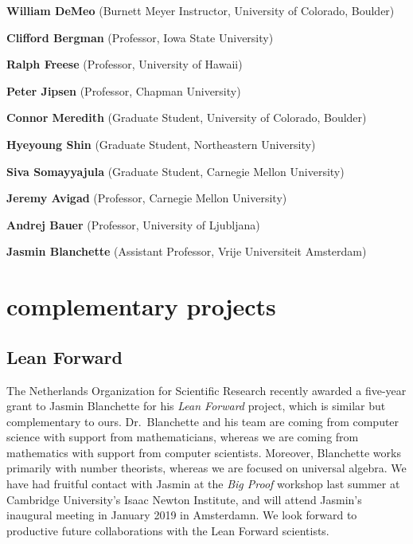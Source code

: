 \documentclass[11pt]{amsart}  %
\begin{document}
\vskip2mm
\hskip4.7mm {\bf William DeMeo} (Burnett Meyer Instructor, University of Colorado, Boulder)

\vskip5mm


\vskip2mm
\hskip4.7mm {\bf Clifford Bergman} (Professor, Iowa State University)

\vskip2mm
\hskip4.7mm {\bf Ralph Freese} (Professor, University of Hawaii)

\vskip2mm
\hskip4.7mm {\bf Peter Jipsen} (Professor, Chapman University)

\vskip2mm
\hskip4.7mm {\bf Connor Meredith} (Graduate Student, University of Colorado, Boulder)

\vskip2mm
\hskip4.7mm {\bf Hyeyoung Shin} (Graduate Student, Northeastern University)

\vskip2mm
\hskip4.7mm {\bf Siva Somayyajula} (Graduate Student, Carnegie Mellon University)



\vskip5mm


\vskip2mm
\hskip4.7mm {\bf Jeremy Avigad} (Professor, Carnegie Mellon University)

\vskip2mm
\hskip4.7mm {\bf Andrej Bauer} (Professor, University of Ljubljana)

\vskip2mm
\hskip4.7mm {\bf Jasmin Blanchette} (Assistant Professor, Vrije Universiteit Amsterdam)


  


\newpage







\section{complementary projects}

\subsection{Lean Forward}
The Netherlands Organization for Scientific Research recently awarded a five-year grant to Jasmin Blanchette for his \emph{Lean Forward} project, which is similar but complementary to ours. Dr.~Blanchette and his team are coming from computer science with support from mathematicians, whereas we are coming from mathematics with support from computer scientists.  
Moreover, Blanchette works primarily with number theorists, whereas we are focused on universal algebra. We have had fruitful contact with Jasmin at the \emph{Big Proof} workshop last summer at Cambridge University's Isaac Newton Institute, and will attend Jasmin's inaugural meeting in January 2019 in Amsterdamn. We look forward to productive future collaborations with the Lean Forward scientists.
\end{document}
